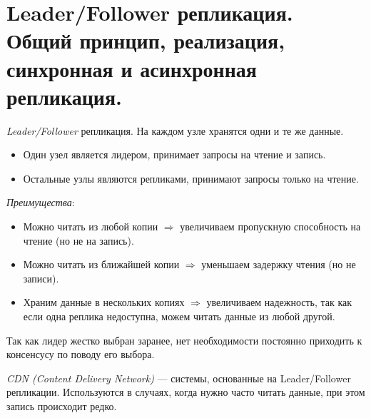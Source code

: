 \section{Leader/Follower репликация. Общий принцип, реализация, синхронная и асинхронная репликация.}

\begin{definition}
    \textit{Leader/Follower} репликация. На каждом узле хранятся одни и те же данные.

    \begin{itemize}
        \item Один узел является лидером, принимает запросы на чтение и запись.
        \item Остальные узлы являются репликами, принимают запросы только на чтение.
    \end{itemize}

    \textit{Преимущества}:
    \begin{itemize}
        \item Можно читать из любой копии $\Rightarrow$ увеличиваем пропускную способность на чтение (но не на запись).
        \item Можно читать из ближайшей копии $\Rightarrow$ уменьшаем задержку чтения (но не записи).
        \item Храним данные в нескольких копиях $\Rightarrow$ увеличиваем надежность, так как если одна реплика недоступна, можем читать данные из любой другой.
    \end{itemize}

\end{definition}

\begin{remark}
    Так как лидер жестко выбран заранее, нет необходимости постоянно приходить к консенсусу по поводу его выбора.
\end{remark}

\begin{definition}
    \textit{CDN (Content Delivery Network)} --- системы, основанные на Leader/Follower репликации. Используются в случаях, когда нужно часто читать данные, при этом запись происходит редко.
\end{definition}

